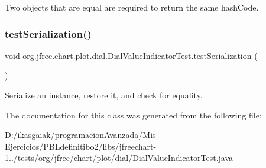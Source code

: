 Two objects that are equal are required to return the same hash\+Code. \mbox{\label{classorg_1_1jfree_1_1chart_1_1plot_1_1dial_1_1_dial_value_indicator_test_a9f2fd60e6e820f14c11163cd1bda4efa}} 
\subsubsection{\texorpdfstring{test\+Serialization()}{testSerialization()}}
{\footnotesize\ttfamily void org.\+jfree.\+chart.\+plot.\+dial.\+Dial\+Value\+Indicator\+Test.\+test\+Serialization (\begin{DoxyParamCaption}{ }\end{DoxyParamCaption})}

Serialize an instance, restore it, and check for equality. 

The documentation for this class was generated from the following file\+:\begin{DoxyCompactItemize}
\item 
D\+:/ikasgaiak/programacion\+Avanzada/\+Mis Ejercicios/\+P\+B\+Ldefinitibo2/libs/jfreechart-\/1../tests/org/jfree/chart/plot/dial/\mbox{\hyperlink{_dial_value_indicator_test_8java}{Dial\+Value\+Indicator\+Test.\+java}}\end{DoxyCompactItemize}
